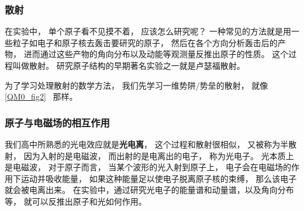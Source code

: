 \subsubsection{散射}
在实验中， 单个原子看不见摸不着， 应该怎么研究呢？ 一种常见的方法就是用一些粒子如电子和原子核去轰击要研究的原子， 然后在各个方向分析轰击后的产物， 进而通过这些产物的角向分布以及动能等观测量反推出原子的性质。 这个过程叫做散射。 研究原子结构的早期著名实验之一就是卢瑟福散射。

为了学习处理散射的数学方法， 我们先学习一维势阱/势垒的散射， 就像\autoref{QM0_fig2}~ 那样。

\subsubsection{原子与电磁场的相互作用}
我们高中所熟悉的光电效应就是\textbf{光电离}， 这个过程和散射很相似， 又被称为半散射， 因为入射的是电磁波， 而出射的是电离出的电子， 称为光电子。 光本质上是电磁波， 对于原子而言， 当某个波形的光入射到原子上， 电子会在电磁场的作用下运动并吸收能量， 如果这种能量足以使电子脱离原子核的束缚， 那么该电子就会被电离出来。 在实验中，通过研究光电子的能量谱和动量谱，以及角向分布等， 就可以反推出原子和光如何作用。
